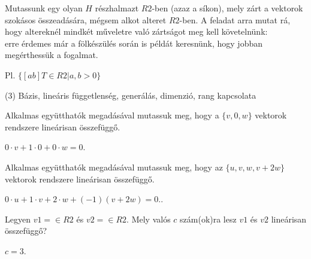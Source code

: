 \begin{frame}
  \begin{tcolorbox}[title={2/5. -Q-}]
      Mutassunk egy olyan $H$ részhalmazt $R2$-ben (azaz a síkon), mely zárt a vektorok szokásos összeadására, mégsem alkot alteret $R2$-ben.
  \tcblower
    A feladat arra mutat rá, hogy altereknél mindkét műveletre való zártságot meg kell követelnünk:\\
    
    erre érdemes már a fölkészülés során is példát keresnünk, hogy jobban megérthessük a fogalmat.
    \mmedskip 
    
    Pl. $\{[a b]T ∈ R2|a,b > 0\}$
  \end{tcolorbox}
\end{frame}


\begin{frame}[plain]
\begin{tcolorbox}[center, colback={myyellow}, coltext={black}, colframe={myyellow}]
    {\RHuge  (3) Bázis, lineáris függetlenség, generálás, dimenzió, rang kapcsolata}
    \mmedskip
\end{tcolorbox}
\end{frame}

\begin{frame}
  \begin{tcolorbox}[title={3/1. -N-}]
      Alkalmas együtthatók megadásával mutassuk meg, hogy a $\{v,0,w\}$ vektorok rendszere lineárisan összefüggő.
  \tcblower

    \mmedskip 
  
    $0·v + 1·0 + 0·w = 0$.
  \end{tcolorbox}
\end{frame}


\begin{frame}
  \begin{tcolorbox}[title={3/2. -N-}]
       Alkalmas együtthatók megadásával mutassuk meg, hogy az $\{u,v,w,v+2w\}$ vektorok rendszere lineárisan összefüggő.
  \tcblower

    \mmedskip 
  
    $0·u + 1·v + 2·w + (−1)(v + 2w) = 0.$.
  \end{tcolorbox}
\end{frame}


\begin{frame}
  \begin{tcolorbox}[title={3/3. -N-}]
       Legyen $v1 =  ∈ R2$ és $v2 =  ∈ R2$. Mely valós $c$ szám(ok)ra lesz $v1$ és $v2$ lineárisan összefüggő?
  \tcblower

    \mmedskip 
  
    $c = 3$.
  \end{tcolorbox}
\end{frame}


